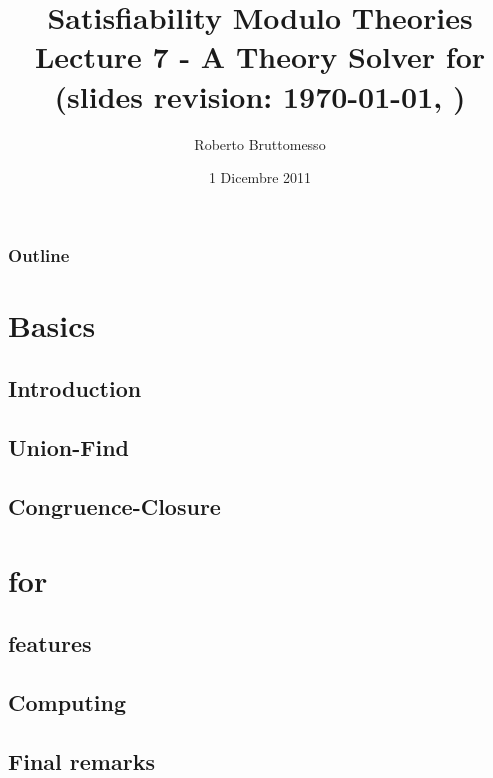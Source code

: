 \documentclass[xcolor=dvipsnames
              ,handout
              ]{beamer}
\title[\tsolver for \Uf]{Satisfiability Modulo Theories\\ Lecture 7 - A Theory Solver for \Uf \\ {\tiny (slides revision: \today, \currenttime)}}
\author[R. Bruttomesso]{\large Roberto Bruttomesso}
\date{1 Dicembre 2011}
\institute[SMT]{\large Seminario di Logica Matematica \\ (Corso Prof. Silvio Ghilardi)}
\begin{document}
\frame{\titlepage}

\begin{frame}
  \frametitle{Outline}
  \tableofcontents
\end{frame}

\section{Basics}
\subsection{Introduction}

\subsection{Union-Find}

\subsection{Congruence-Closure}


\section{\tsolver for \Uf}
\subsection{\tsolver features}

\subsection{Computing \tconflicts}

\subsection{Final remarks}

\end{document}
